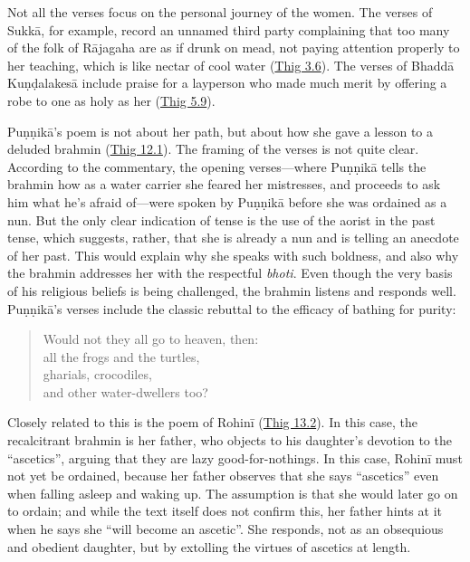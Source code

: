 \documentclass[12pt,openany]{book}%
\begin{document}
Not all the verses focus on the personal journey of the women. The verses of \textsanskrit{Sukkā}, for example, record an unnamed third party complaining that too many of the folk of \textsanskrit{Rājagaha} are as if drunk on mead, not paying attention properly to her teaching, which is like nectar of cool water (\href{https://suttacentral.net/thig3.6}{Thig 3.6}). The verses of \textsanskrit{Bhaddā} \textsanskrit{Kuṇḍalakesā} include praise for a layperson who made much merit by offering a robe to one as holy as her (\href{https://suttacentral.net/thig5.9}{Thig 5.9}).

\textsanskrit{Puṇṇikā}’s poem is not about her path, but about how she gave a lesson to a deluded brahmin (\href{https://suttacentral.net/thig12.1}{Thig 12.1}). The framing of the verses is not quite clear. According to the commentary, the opening verses—where \textsanskrit{Puṇṇikā} tells the brahmin how as a water carrier she feared her mistresses, and proceeds to ask him what he’s afraid of—were spoken by \textsanskrit{Puṇṇikā} before she was ordained as a nun. But the only clear indication of tense is the use of the aorist in the past tense, which suggests, rather, that she is already a nun and is telling an anecdote of her past. This would explain why she speaks with such boldness, and also why the brahmin addresses her with the respectful \textit{bhoti}. Even though the very basis of his religious beliefs is being challenged, the brahmin listens and responds well. \textsanskrit{Puṇṇikā}’s verses include the classic rebuttal to the efficacy of bathing for purity:

\begin{quotation}%
Would not they all go to heaven, then: \\
all the frogs and the turtles, \\
gharials, crocodiles, \\
and other water-dwellers too?

%
\end{quotation}

Closely related to this is the poem of \textsanskrit{Rohinī} (\href{https://suttacentral.net/thig13.2}{Thig 13.2}). In this case, the recalcitrant brahmin is her father, who objects to his daughter’s devotion to the “ascetics”, arguing that they are lazy good-for-nothings. In this case, \textsanskrit{Rohinī} must not yet be ordained, because her father observes that she says “ascetics” even when falling asleep and waking up. The assumption is that she would later go on to ordain; and while the text itself does not confirm this, her father hints at it when he says she “will become an ascetic”. She responds, not as an obsequious and obedient daughter, but by extolling the virtues of ascetics at length.
\end{document}
